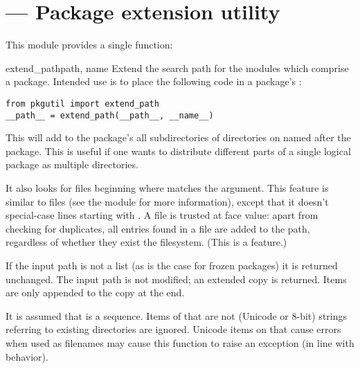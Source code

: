 \section{ ---
         Package extension utility}



This module provides a single function:

\begin{funcdesc}{extend_path}{path, name}
  Extend the search path for the modules which comprise a package.
  Intended use is to place the following code in a package's
  :

\begin{verbatim}
from pkgutil import extend_path
__path__ = extend_path(__path__, __name__)
\end{verbatim}

  This will add to the package's  all subdirectories of
  directories on  named after the package.  This is
  useful if one wants to distribute different parts of a single
  logical package as multiple directories.

  It also looks for  files beginning where \code{*}
  matches the  argument.  This feature is similar to
   files (see the  module for more
  information), except that it doesn't special-case lines starting
  with .  A  file is trusted at face value:
  apart from checking for duplicates, all entries found in a
   file are added to the path, regardless of whether they
  exist the filesystem.  (This is a feature.)

  If the input path is not a list (as is the case for frozen
  packages) it is returned unchanged.  The input path is not
  modified; an extended copy is returned.  Items are only appended
  to the copy at the end.

  It is assumed that  is a sequence.  Items of
   that are not (Unicode or 8-bit) strings referring to
  existing directories are ignored.  Unicode items on 
  that cause errors when used as filenames may cause this function to
  raise an exception (in line with  behavior).
\end{funcdesc}

